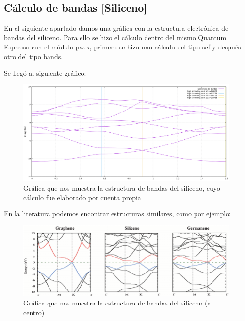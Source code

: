 
\subsection{Cálculo de bandas [Siliceno]}

En el siguiente apartado damos una gráfica con la estructura electrónica de bandas del siliceno. Para 
ello se hizo el cálculo dentro del mismo Quantum Espresso con el módulo pw.x, primero se hizo uno cálculo 
del tipo scf y después otro del tipo bands.

Se llegó al siguiente gráfico:

\begin{figure}[H]
    \centering
    \includegraphics[scale=0.45]{images_siliceno/bands_structure.png}
    \caption{Gráfica que nos muestra la estructura de bandas del siliceno, cuyo cálculo fue elaborado por cuenta propia}
\end{figure}

En la literatura podemos encontrar estructuras similares, como por ejemplo:

\begin{figure}[H]
    \centering
    \includegraphics[scale=0.5]{images_siliceno/Band-structures-of-graphene-left-silicene-centre-and-germanene-right-Valence-and.png}
    \caption{Gráfica que nos muestra la estructura de bandas del siliceno (al centro) \cite{miro2014atlas} }
\end{figure}

